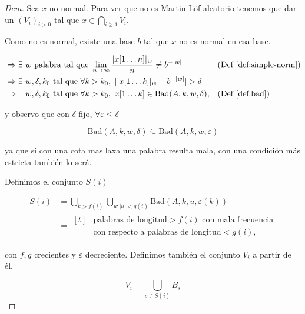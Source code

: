 \documentclass{article}
\theoremstyle{definition} %
\newcommand{\first}[2]{#2[1 \dots #1]}
\newcommand{\sucML}{(V_i)_{i > 0}}
\newcommand{\ML}{Martin-Löf }
\newcommand{\occurrencesOf}[2]{|#2|_#1}
\newcommand{\Bad}[4]{\text{Bad}(#1, #2, #3, #4)}
\begin{document}
\begin{proof}[Dem]
    Sea $x$ no normal. Para ver que no es \ML aleatorio tenemos que dar un
     $\sucML$ tal que $x \in \bigcap_{i \geq 1} V_i$.

    Como no es normal, existe una base $b$ tal que $x$ no es normal en esa
    base.

    \begin{align*}
        &\Rightarrow
            \exists\ w \text{ palabra tal que }
            \lim_{n\to\infty}
                \frac{\occurrencesOf{w}{\first{n}{x}}}{n}
            \neq b^{-|w|}
        &&\text{(Def \ref{def:simple-norm})}\\
        &\Rightarrow
            \exists\ w, \delta, k_0 \text{ tal que }
                \forall k > k_0,\
                    |\occurrencesOf{w}{\first{k}{x}} - b^{-|w|}| > \delta\\
        &\Rightarrow
            \exists\ w, \delta, k_0 \text{ tal que }
            \forall k > k_0,\
                \first{k}{x} \in \Bad{A}{k}{w}{\delta},
        &&\text{(Def \ref{def:bad})}
    \end{align*}

    y observo que con $\delta$ fijo, $\forall \varepsilon \leq \delta$

    \[
        \Bad{A}{k}{w}{\delta} \subseteq \Bad{A}{k}{w}{\varepsilon}
    \]

    ya que si con una cota mas laxa una palabra resulta mala, con una condición
    más estricta también lo será.

    Definimos el conjunto $S(i)$

    \begin{align*}
        S(i)
            &= \bigcup_{k > f(i)} 
                \bigcup_{u : |u| < g(i)}
                    \Bad{A}{k}{u}{\varepsilon(k)}\\
            &=
                \begin{aligned}[t]
                &\text{palabras de longitud} > f(i)
                \text{ con mala frecuencia}\\
                &\text{con respecto a palabras de longitud} < g(i),
                \end{aligned}
    \end{align*}

    con $f, g$ crecientes y $\varepsilon$ decreciente. Definimos también el
    conjunto $V_i$ a partir de él,

    \[
        V_i = \bigcup_{s \in S(i)} B_s
    \]


\end{proof}
\end{document}

